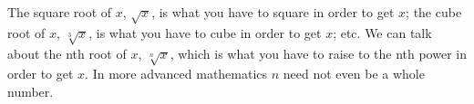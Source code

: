 The square root of $x$, $ \sqrt{x} $, is what you have to
  square in order to get $x$;
  the cube root of $x$, $ \sqrt[3]{x} $, is what you have to
  cube in order to get $x$; etc.
  We can talk about the nth root of $x$, $ \sqrt[n]{x} $, 
  which is what you have to raise to the nth power in order to get
  $x$. In more advanced mathematics $n$ need not even be a whole number.